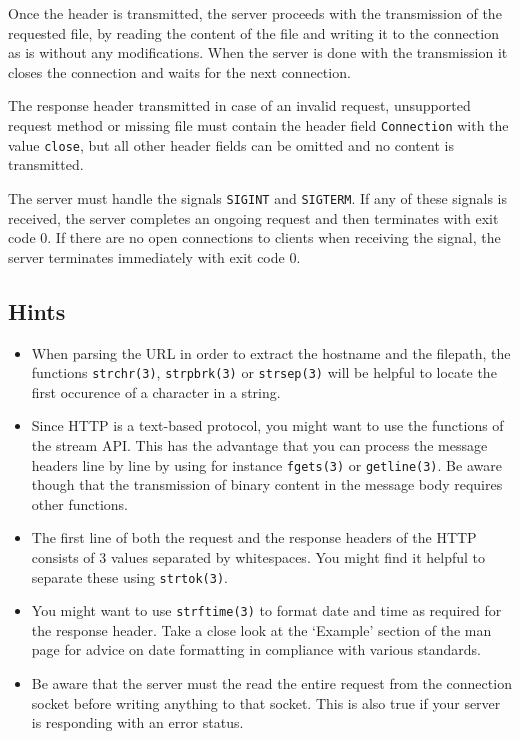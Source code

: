 Once the header is transmitted,
the server proceeds with the transmission of the requested file,
by reading the content of the file and writing it to the connection as is
without any modifications.
When the server is done with the transmission it closes the connection
and waits for the next connection.

The response header transmitted in case of an invalid request,
unsupported request method or missing file must contain
the header field \verb|Connection| with the value \verb|close|,
but all other header fields can be omitted and no content is transmitted.

The server must handle the signals \verb|SIGINT| and \verb|SIGTERM|.
If any of these signals is received,
the server completes an ongoing request
and then terminates with exit code 0.
If there are no open connections to clients when receiving the signal,
the server terminates immediately with exit code 0.

\subsection*{Hints}
\begin{itemize}
\item When parsing the URL
in order to extract the hostname and the filepath,
the functions \verb|strchr(3)|, \verb|strpbrk(3)| or \verb|strsep(3)|
will be helpful to locate the first occurence of a character in a string.

\item Since HTTP is a text-based protocol,
you might want to use the functions of the stream API.
This has the advantage that you can process the message headers line by line
by using for instance \verb|fgets(3)| or \verb|getline(3)|.
Be aware though that the transmission of binary content
in the message body requires other functions.

\item The first line of both the request and the response headers of the HTTP
consists of 3 values separated by whitespaces.
You might find it helpful to separate these using \verb|strtok(3)|.

\item You might want to use \verb|strftime(3)|
to format date and time as required for the response header.
Take a close look at the `Example' section of the man page
for advice on date formatting in compliance with various standards.

\item Be aware that the server must the read the entire request
from the connection socket before writing anything to that socket.
This is also true if your server is responding with an error status.
\end{itemize}

